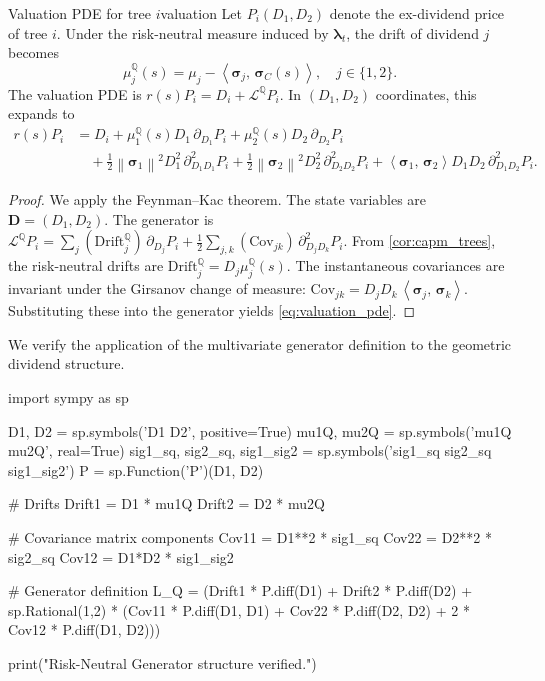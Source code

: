 ﻿\documentclass[11pt,letterpaper,oneside]{article}
\numberwithin{equation}{section}
\newcommand{\1}{\mathbf{1}}
\newcommand{\norm}[1]{\left\lVert #1\right\rVert}
\newcommand{\ip}[2]{\left\langle #1,\,#2\right\rangle}
\begin{document}
\begin{proposition}{Valuation PDE for tree $i$}{valuation}
Let $P_i(D_1,D_2)$ denote the ex-dividend price of tree $i$. Under the risk-neutral measure induced by $\bm{\lambda}_t$, the drift of dividend $j$ becomes
\begin{equation}\label{eq:rn_drift}
  \mu_j^{\mathbb{Q}}(s) = \mu_j-\ip{\bm{\sigma}_j}{\bm{\sigma}_C(s)}, \quad j\in\{1,2\}.
\end{equation}
The valuation PDE is $r(s) P_i = D_i + \mathcal{L}^{\mathbb{Q}} P_i$. In $(D_1,D_2)$ coordinates, this expands to
\begin{align}\label{eq:valuation_pde}
  r(s) P_i &= D_i
    + \mu_1^{\mathbb{Q}}(s) D_1\,\partial_{D_1} P_i
    + \mu_2^{\mathbb{Q}}(s) D_2\,\partial_{D_2} P_i \\
  &\quad + \tfrac12 \norm{\bm{\sigma}_1}^2 D_1^2\,\partial^2_{D_1 D_1} P_i
    + \tfrac12 \norm{\bm{\sigma}_2}^2 D_2^2\,\partial^2_{D_2 D_2} P_i
    + \ip{\bm{\sigma}_1}{\bm{\sigma}_2} D_1 D_2\,\partial^2_{D_1 D_2} P_i.
\end{align}
\end{proposition}
\begin{proof}
We apply the Feynman--Kac theorem. The state variables are $\bm{D}=(D_1,D_2)$. The generator is
\(
  \mathcal{L}^{\mathbb{Q}} P_i = \sum_j (\text{Drift}_j^{\mathbb{Q}})\,\partial_{D_j} P_i + \tfrac{1}{2}\sum_{j,k} (\text{Cov}_{jk})\,\partial^2_{D_j D_k} P_i.
\)
From \cref{cor:capm_trees}, the risk-neutral drifts are $\text{Drift}_j^{\mathbb{Q}} = D_j\mu_j^{\mathbb{Q}}(s)$. The instantaneous covariances are invariant under the Girsanov change of measure: $\text{Cov}_{jk} = D_j D_k \,\ip{\bm{\sigma}_j}{\bm{\sigma}_k}$. Substituting these into the generator yields \cref{eq:valuation_pde}.
\end{proof}

\begin{sympycheck}[title={Verification: Structure of the Risk-Neutral Generator $\mathcal{L}^{\mathbb{Q}}$}]
We verify the application of the multivariate generator definition to the geometric dividend structure.
\begin{pyconsole}
import sympy as sp

D1, D2 = sp.symbols('D1 D2', positive=True)
mu1Q, mu2Q = sp.symbols('mu1Q mu2Q', real=True)
sig1_sq, sig2_sq, sig1_sig2 = sp.symbols('sig1_sq sig2_sq sig1_sig2')
P = sp.Function('P')(D1, D2)

# Drifts
Drift1 = D1 * mu1Q
Drift2 = D2 * mu2Q

# Covariance matrix components
Cov11 = D1**2 * sig1_sq
Cov22 = D2**2 * sig2_sq
Cov12 = D1*D2 * sig1_sig2

# Generator definition
L_Q = (Drift1 * P.diff(D1) + Drift2 * P.diff(D2) +
       sp.Rational(1,2) * (Cov11 * P.diff(D1, D1) + Cov22 * P.diff(D2, D2) +
                           2 * Cov12 * P.diff(D1, D2)))

print("Risk-Neutral Generator structure verified.")
\end{pyconsole}
\end{sympycheck}
\end{document}
